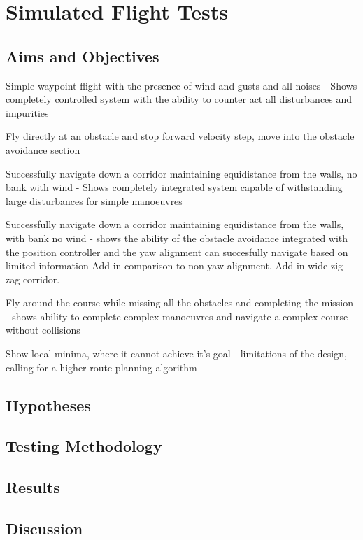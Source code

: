 \chapter{Simulated Flight Tests}

	\section{Aims and Objectives}
	Simple waypoint flight with the presence of wind and gusts and all noises - Shows completely controlled system with the ability to counter act all disturbances and impurities
	
	Fly directly at an obstacle and stop forward velocity step, move into the obstacle avoidance section
	
	Successfully navigate down a corridor maintaining equidistance from the walls, no bank with wind - Shows completely integrated system capable of withstanding large disturbances for simple manoeuvres
	
	Successfully navigate down a corridor maintaining equidistance from the walls, with bank no wind - shows the ability of the obstacle avoidance integrated with the position controller and the yaw alignment can succesfully navigate based on limited information
	Add in comparison to non yaw alignment. Add in wide zig zag corridor.
	
	Fly around the course while missing all the obstacles and completing the mission - shows ability to complete complex manoeuvres and navigate a complex course without collisions
	
	Show local minima, where it cannot achieve it's goal - limitations of the design, calling for a higher route planning algorithm
	

	\section{Hypotheses}

	\section{Testing Methodology}

	\section{Results}

	\section{Discussion}
